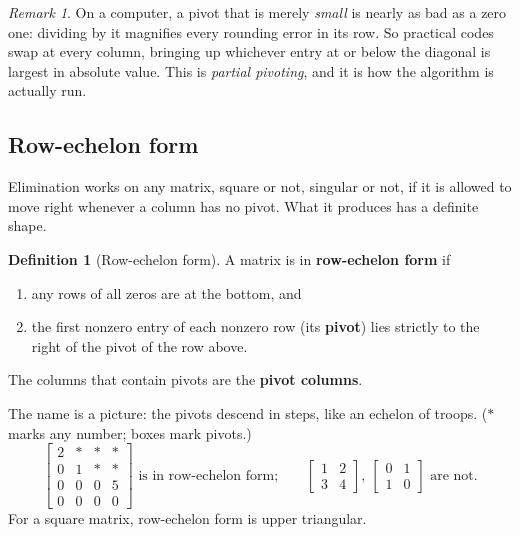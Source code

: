 \documentclass[11pt]{article}
\theoremstyle{plain}
\theoremstyle{definition}
\newtheorem{defn}{Definition}[section]
\theoremstyle{remark}
\newtheorem*{rmk}{Remark}
\begin{document}
\begin{rmk}
On a computer, a pivot that is merely \emph{small} is nearly as bad as a zero
one: dividing by it magnifies every rounding error in its row. So practical codes
swap at every column, bringing up whichever entry at or below the diagonal is
largest in absolute value. This is \emph{partial pivoting}, and it is how the
algorithm is actually run.
\end{rmk}

\subsection{Row-echelon form}
Elimination works on any matrix, square or not, singular or not, if it is allowed
to move right whenever a column has no pivot. What it produces has a definite
shape.

\begin{defn}[Row-echelon form]
A matrix is in \textbf{row-echelon form} if
\begin{enumerate}[label=(\arabic*),leftmargin=2em,itemsep=2pt]
  \item any rows of all zeros are at the bottom, and
  \item the first nonzero entry of each nonzero row (its \textbf{pivot}) lies
        strictly to the right of the pivot of the row above.
\end{enumerate}
The columns that contain pivots are the \textbf{pivot columns}.
\end{defn}

\noindent The name is a picture: the pivots descend in steps, like an echelon of
troops. ($\ast$ marks any number; boxes mark pivots.)
\[
  \begin{bmatrix}\boxed{2}&\ast&\ast&\ast\\0&\boxed{1}&\ast&\ast\\0&0&0&\boxed{5}\\0&0&0&0\end{bmatrix}
  \text{ is in row-echelon form;}
  \qquad
  \begin{bmatrix}1&2\\3&4\end{bmatrix},\ \begin{bmatrix}0&1\\1&0\end{bmatrix}
  \text{ are not.}
\]
For a square matrix, row-echelon form is upper triangular.
\end{document}
